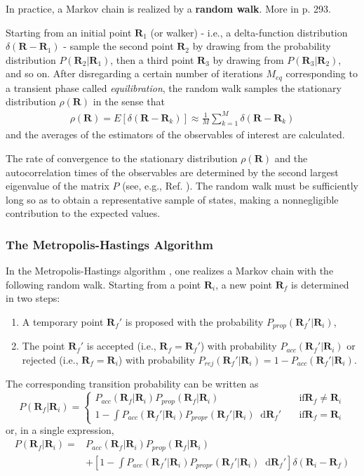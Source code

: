 \documentclass[twoside,english]{uiofysmaster}
\newcommand*\dif{\mathop{}\!\mathrm{d}}
\begin{document}
In practice, a Markov chain is realized by a \textbf{random walk}. More in \cite{Toulouse2016} p. 293.

Starting from an initial point $\bm{R}_1$ (or walker) - i.e., a delta-function distribution $\delta (\bm{R} - \bm{R}_1)$ - sample the second point $\bm{R}_2$ by drawing from the probability distribution $P(\bm{R}_2|\bm{R}_1)$, then a third point $\bm{R}_3$ by drawing from $P(\bm{R}_3 | \bm{R}_2)$, and so on. After disregarding a certain number of iterations $M_{eq}$ corresponding to a transient phase called \textit{equilibration}, the random walk samples the stationary distribution $\rho(\bm{R})$ in the sense that
\begin{align}
	\rho(\bm{R}) = E[\delta (\bm{R} - \bm{R}_k) ] \approx \frac{1}{M} \sum_{k=1}^M \delta (\bm{R} - \bm{R}_k)
\end{align}
and the averages of the estimators of the observables of interest are calculated.

The rate of convergence to the stationary distribution $\rho(\bm{R})$ and the autocorrelation times of the observables are determined by the second largest eigenvalue of the matrix $P$ (see, e.g., Ref. \cite{Gilks1996}). The random walk must be sufficiently long so as to obtain a representative sample of states, making a nonnegligible contribution to the expected values. 
\cite{Toulouse2016}

\subsubsection{The Metropolis-Hastings Algorithm}
In the Metropolis-Hastings algorithm , one realizes a Markov chain with the following random walk. Starting from a point $\bm{R}_i$, a new point $\bm{R}_f$ is determined in two steps:
\begin{enumerate}
	\item A temporary point $\bm{R}_f'$ is proposed with the probability $P_{prop} (\bm{R}_f' | \bm{R}_i)$,
	\item The point $\bm{R}_f'$ is accepted (i.e., $\bm{R}_f = \bm{R}_f'$) with probability $P_{acc} (\bm{R}_f' | \bm{R}_i)$ or rejected (i.e., $\bm{R}_f = \bm{R}_i$) with probability $P_{rej}(\bm{R}_f' | \bm{R}_i) = 1 - P_{acc} (\bm{R}_f' | \bm{R}_i)$.
\end{enumerate}
The corresponding transition probability can be written as
\[ P(\bm{R}_f |\bm{R}_i ) = \begin{cases}
				P_{acc}(\bm{R}_f |\bm{R}_i ) P_{prop} (\bm{R}_f |\bm{R}_i )  
				& \quad \text{if} \bm{R}_f \neq \bm{R}_i \\
				1 - \int  P_{acc}(\bm{R}_f' |\bm{R}_i ) P_{propr} (\bm{R}_f' |\bm{R}_i )  \dif \bm{R}_f'
				& \quad \text{if} \bm{R}_f = \bm{R}_i  
\end{cases} \]
or, in a single expression,
\begin{align}
	P(\bm{R}_f |\bm{R}_i ) =& P_{acc}(\bm{R}_f |\bm{R}_i ) P_{prop} (\bm{R}_f |\bm{R}_i ) \\
	&+ [1-\int  P_{acc}(\bm{R}_f' |\bm{R}_i ) P_{propr} (\bm{R}_f' |\bm{R}_i )  \dif \bm{R}_f'] \delta(\bm{R}_i - \bm{R}_f)
\end{align}
\end{document}
